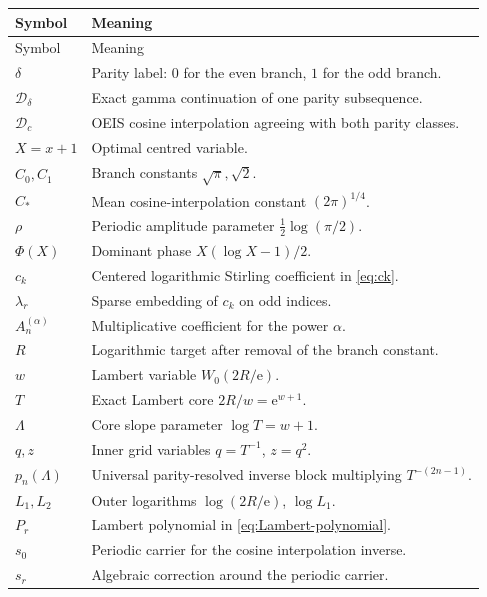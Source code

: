 \documentclass[11pt,oneside]{article}
\theoremstyle{plain}
\theoremstyle{definition}
\theoremstyle{remark}
\newcommand{\e}{\mathrm e}
\newcommand{\DF}{\mathcal D}
\newcommand{\Dc}{\mathcal D_{\!c}}
\begin{document}
\begin{longtable}{>{\raggedright\arraybackslash}p{}
                  >{\raggedright\arraybackslash}p{}}
\toprule
Symbol & Meaning\\
\midrule
\endfirsthead
\toprule
Symbol & Meaning\\
\midrule
\endhead
\(\delta\) & Parity label: \(0\) for the even branch, \(1\) for the odd branch.\\
\(\DF_\delta\) & Exact gamma continuation of one parity subsequence.\\
\(\Dc\) & OEIS cosine interpolation agreeing with both parity classes.\\
\(X=x+1\) & Optimal centred variable.\\
\(C_0,C_1\) & Branch constants \(\sqrt\pi,\sqrt2\).\\
\(C_*\) & Mean cosine-interpolation constant \((2\pi)^{1/4}\).\\
\(\rho\) & Periodic amplitude parameter \(\tfrac12\log(\pi/2)\).\\
\(\Phi(X)\) & Dominant phase \(X(\log X-1)/2\).\\
\(c_k\) & Centered logarithmic Stirling coefficient in \cref{eq:ck}.\\
\(\lambda_r\) & Sparse embedding of \(c_k\) on odd indices.\\
\(A_n^{(\alpha)}\) & Multiplicative coefficient for the power \(\alpha\).\\
\(R\) & Logarithmic target after removal of the branch constant.\\
\(w\) & Lambert variable \(W_0(2R/\e)\).\\
\(T\) & Exact Lambert core \(2R/w=\e^{w+1}\).\\
\(\Lambda\) & Core slope parameter \(\log T=w+1\).\\
\(q,z\) & Inner grid variables \(q=T^{-1}\), \(z=q^2\).\\
\(p_n(\Lambda)\) & Universal parity-resolved inverse block multiplying
                     \(T^{-(2n-1)}\).\\
\(L_1,L_2\) & Outer logarithms \(\log(2R/\e)\), \(\log L_1\).\\
\(P_r\) & Lambert polynomial in \cref{eq:Lambert-polynomial}.\\
\(s_0\) & Periodic carrier for the cosine interpolation inverse.\\
\(s_r\) & Algebraic correction around the periodic carrier.\\
\bottomrule
\end{longtable}
\end{document}
